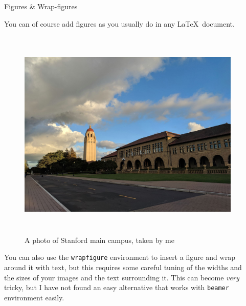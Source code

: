 \documentclass[final]{beamer}
\newlength{\sepwid}
\newlength{\secondcolwid}
\begin{document}
\begin{frame}[t]
\begin{columns}[t]
\begin{column}{\sepwid}\end{column}

\begin{column}[t]{\secondcolwid}
	\begin{block}{Figures \& Wrap-figures}
		
		You can of course add figures as you usually do in any \LaTeX \, document.
		
		\begin{figure}[H]
			\centering
			\includegraphics[height=4in]{./img/stanford_photo.jpg}
			\caption{A photo of Stanford main campus, taken by me}
			\label{fig:stanford_photo}
		\end{figure}
		
		You can also use the \texttt{wrapfigure} environment to insert a figure and wrap around it with text, but this requires some careful tuning of the widths and the sizes of your images and the text surrounding it. This can become \textit{very} tricky, but I have not found an easy alternative that works with \texttt{beamer} environment easily.


\end{block}
\end{column}
\end{columns}
\end{frame}
\end{document}
